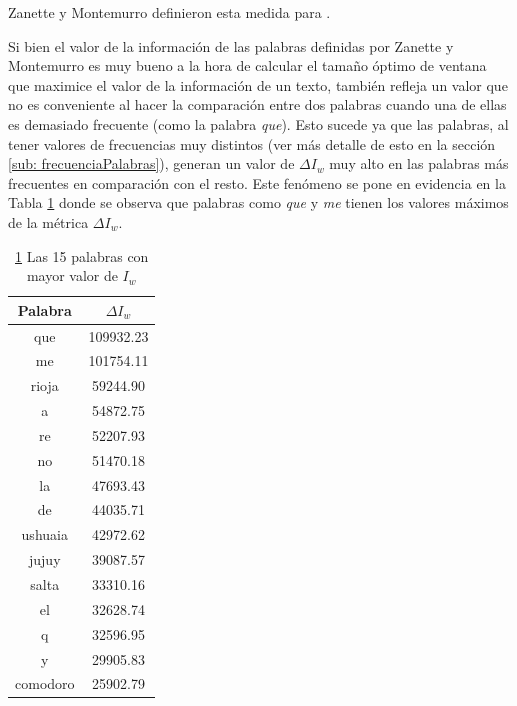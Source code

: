 Zanette y Montemurro definieron esta medida para .


Si bien el valor de la información de las palabras definidas por Zanette y Montemurro es muy bueno a la hora de calcular el tamaño óptimo de ventana que maximice el valor de la información de un texto, también refleja un valor que no es conveniente al hacer la comparación entre dos palabras cuando una de ellas es demasiado frecuente (como la palabra \textit{que}). Esto sucede ya que las palabras, al tener valores de frecuencias muy distintos (ver más detalle de esto en la sección \ref{sub: frecuenciaPalabras}), generan un valor de $\Delta I_w$ muy alto en las palabras más frecuentes en comparación con el resto. Este fenómeno se pone en evidencia en la Tabla \ref{tab:zanette} donde se observa que palabras como \textit{que} y \textit{me} tienen los valores máximos de la métrica $\Delta I_w$.



\begin{table}[h]
\centering

\begin{tabular}{ c c }
\toprule
Palabra  & $\Delta I_w$                      \\
\midrule
que      & 109932.23                         \\
me       & 101754.11                        \\
rioja    & 59244.90                          \\
a        & 54872.75                          \\
re       & 52207.93                          \\
no       & 51470.18                          \\
la       & 47693.43                          \\
de       & 44035.71                          \\
ushuaia  & 42972.62                          \\
jujuy    & 39087.57                          \\
salta    & 33310.16                          \\
el       & 32628.74                          \\
q        & 32596.95                          \\
y        & 29905.83                          \\
comodoro & 25902.79                         \\
\bottomrule
\end{tabular}
\caption{\ref{tab:zanette} Las 15 palabras con mayor valor de $I_w$ }
\label{tab:zanette}
\end{table}

